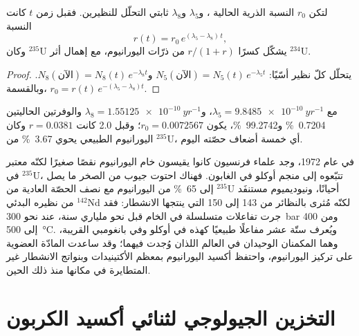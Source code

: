 \begin{proposition}\label{prop:b2:energy-geology:u235}
لتكن $r_0$ النسبة الذرية الحالية ، و$\lambda_5$ و$\lambda_8$ ثابتي التحلّل
للنظيرين. فقبل زمن $t$ كانت النسبة
\begin{equation}
r(t) = r_0\,e^{(\lambda_5 - \lambda_8)\,t} ,
\label{eq:b2:energy-geology:u235}
\end{equation}
وكان $^{235}$U يشكّل كسرًا $r/(1 + r)$ من ذرّات اليورانيوم، مع إهمال أثر
$^{234}$U.
\end{proposition}

\begin{proof}
يتحلّل كلّ نظير أسّيًا: $N_5(\text{الآن}) = N_5(t)\,e^{-\lambda_5 t}$ و$N_8(\text{الآن})
= N_8(t)\,e^{-\lambda_8 t}$. وبالقسمة، $r_0 = r(t)\,e^{-(\lambda_5 - \lambda_8)t}$.
\end{proof}

مع $\lambda_5 = \qty{9.8485e-10}{yr^{-1}}$، و$\lambda_8 = \qty{1.55125e-10}{yr^{-1}}$ والوفرتين
الحاليتين \qty{0.7204}{\percent} و\qty{99.2742}{\percent}، يكون $r_0 = 0.0072567$؛ وقبل \qty{2.0}{\Ga}
كانت $r = 0.0381$ وكان اليورانيوم الطبيعي يحوي \qty{3.67}{\percent} من $^{235}$U، أي خمسة أضعاف
حصّته اليوم.

\begin{history}
في عام 1972، وجد علماء فرنسيون كانوا يقيسون خام اليورانيوم نقصًا صغيرًا لكنّه معتبر في
$^{235}$U، تتبّعوه إلى منجم أوكلو في الغابون. فهناك احتوت جيوب من الصخر ما يصل إلى
\qty{65}{\percent} من اليورانيوم مع نصف الحصّة العادية من $^{235}$U أحيانًا، ونيوديميوم
مستنفَد من نظيره البدئي $^{142}$Nd لكنّه مُثرى بالنظائر من 143 إلى 150 التي ينتجها
الانشطار: فقد جرت تفاعلات متسلسلة في الخام قبل نحو ملياري سنة، عند نحو \qty{300}{bar}
ومن 400 إلى \qty{500}{\celsius}. ويُعرف ستّة عشر مفاعلًا طبيعيًا كهذه في أوكلو وفي
بانغومبي القريبة، وهما المكمنان الوحيدان في العالم اللذان وُجدت فيهما؛ وقد ساعدت المادّة العضوية على
تركيز اليورانيوم، واحتفظ أكسيد اليورانيوم بمعظم الأكتينيدات وبنواتج الانشطار
غير المتطايرة في مكانها منذ ذلك الحين.
\end{history}

\section{التخزين الجيولوجي لثنائي أكسيد الكربون}\label{sec:b2:energy-geology:ccs}

